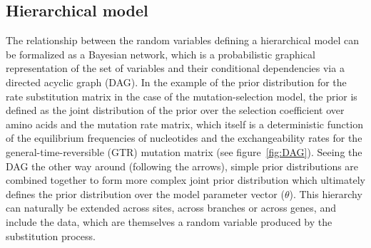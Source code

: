\subsection{Hierarchical model}
\label{subsec:intro-hierarchical-models}
The relationship between the random variables defining a hierarchical model can be formalized as a Bayesian network, which is a probabilistic graphical representation of the set of variables and their conditional dependencies via a directed acyclic graph (DAG).
In the example of the prior distribution for the rate substitution matrix in the case of the mutation-selection model, the prior is defined as the joint distribution of the prior over the selection coefficient over amino acids and the mutation rate matrix, which itself is a deterministic function of the equilibrium frequencies of nucleotides and the exchangeability rates for the general-time-reversible (\acrshort{GTR}) mutation matrix (see figure~\ref{fig:DAG}).
Seeing the DAG the other way around (following the arrows), simple prior distributions are combined together to form more complex joint prior distribution which ultimately defines the prior distribution over the model parameter vector ($\theta$).
This hierarchy can naturally be extended across sites, across branches or across genes, and include the data, which are themselves a random variable produced by the substitution process.

